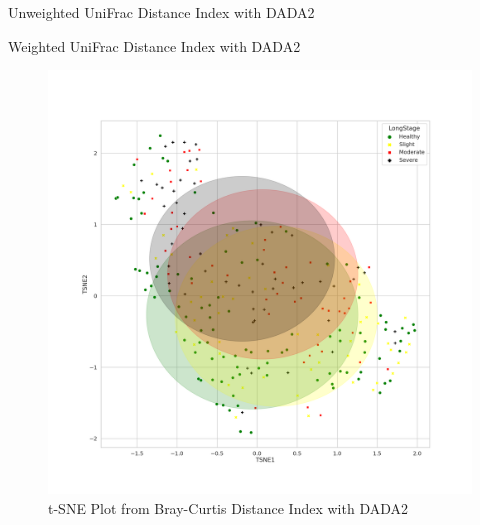\documentclass[a4paper]{article}
\begin{document}
            \begin{table}[p]
                \centering
                \caption{Unweighted UniFrac Distance Index with DADA2}
                \label{tb:unweighted-dada2}
            \end{table}

            \begin{table}[p]
                \centering
                \caption{Weighted UniFrac Distance Index with DADA2}
                \label{tb:weighted-dada2}
            \end{table}

            \begin{figure}[p]
                \centering
                \includegraphics[width=0.6 \linewidth]{figures/BetaDiversity/DADA2.bray_curtis.png}
                \caption{t-SNE Plot from Bray-Curtis Distance Index with DADA2}
                \label{fig:tsne-bray-dada2}
            \end{figure}
\end{document}
